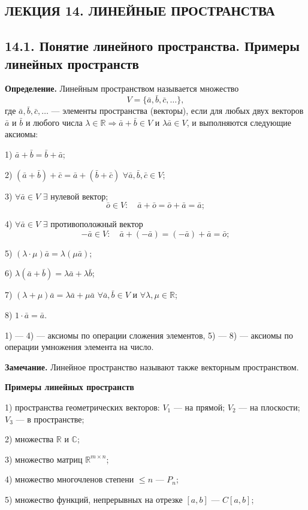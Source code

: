 \documentclass[12pt,a4paper]{article}
\newcommand{\va}{\bar a}
\newcommand{\vb}{\bar b}
\newcommand{\vc}{\bar c}
\newcommand{\vo}{\bar o}
\begin{document}
\setcounter{page}{101}

\subsection*{\textbf{ЛЕКЦИЯ 14. ЛИНЕЙНЫЕ ПРОСТРАНСТВА}}

\subsection*{\textbf{14.1. Понятие линейного пространства. Примеры
линейных пространств}}

\textbf{Определение.} Линейным пространством называется множество
$$
V=\{\va,\vb,\vc,\ldots\},
$$
где $\va,\vb,\vc,\ldots$ --- элементы пространства (векторы), если
для любых двух векторов $\va$ и $\vb$ и любого числа
$\lambda\in\mathbb R\Rightarrow \va+\vb\in V$ и $\lambda\va\in V$, и
выполняются следующие аксиомы:

1) $\va+\vb=\vb+\va$;

2) $(\va+\vb)+\vc=\va+(\vb+\vc)$ $\forall\va,\vb,\vc\in V$;

3) $\forall\va\in V$ $\exists$ нулевой вектор;
$$
\vo\in V:\quad \va+\vo=\vo+\va=\va;
$$

4) $\forall\va\in V$ $\exists$ противоположный вектор
$$
-\va\in V:\quad \va+(-\va)=(-\va)+\va=\vo;
$$

5) $(\lambda\cdot\mu)\va=\lambda(\mu\va)$;

6) $\lambda(\va+\vb)=\lambda\va+\lambda\vb$;

7) $(\lambda+\mu)\va=\lambda\va+\mu\va$ $\forall\va,\vb\in V$ и
$\forall\lambda,\mu\in\mathbb R$;

8) $1\cdot\va=\va$.

1) --- 4) --- аксиомы по операции сложения элементов, 5) --- 8) ---
аксиомы по операции умножения элемента на число.

\textbf{Замечание.} Линейное пространство называют также векторным
пространством.

\textbf{Примеры линейных пространств}

1) пространства геометрических векторов: $V_1$ --- на прямой; $V_2$
--- на плоскости; $V_3$ --- в пространстве;

2) множества $\mathbb R$ и $\mathbb C$;

3) множество матриц $\mathbb R^{m\times n}$;

4) множество многочленов степени $\le n$ --- $P_n$;

5) множество функций, непрерывных на отрезке $[a,b]$ --- $C[a,b]$;
\end{document}

